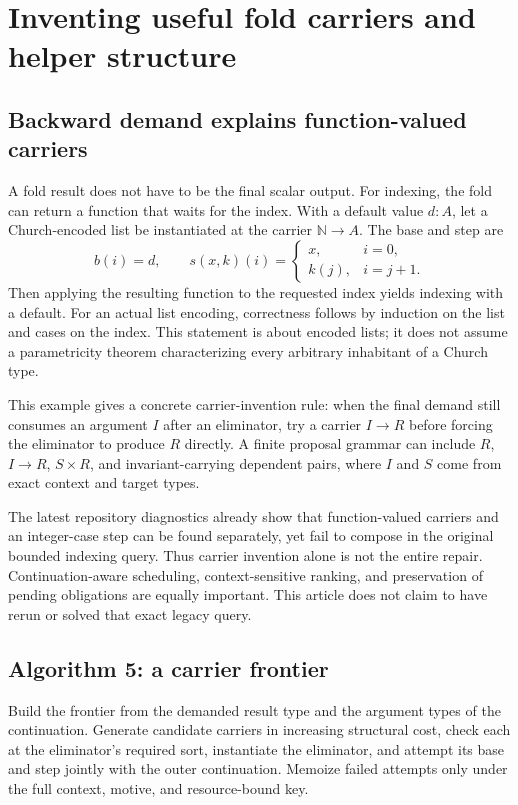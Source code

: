 \documentclass[11pt,letterpaper]{article}
\theoremstyle{definition}\newtheorem{definition}[theorem]{Definition}
\theoremstyle{remark}\newtheorem{remark}[theorem]{Remark}
\begin{document}
\section{Inventing useful fold carriers and helper structure}
\label{sec:carriers}

\subsection{Backward demand explains function-valued carriers}

A fold result does not have to be the final scalar output. For indexing, the
fold can return a function that waits for the index. With a default value $d:A$,
let a Church-encoded list be instantiated at the carrier $\mathbb N\to A$.
The base and step are
\[
 b(i)=d,\qquad
 s(x,k)(i)=
 \begin{cases}x,&i=0,\\ k(j),&i=j+1.\end{cases}
\]
Then applying the resulting function to the requested index yields indexing with
a default. For an actual list encoding, correctness follows by induction on the
list and cases on the index. This statement is about encoded lists; it does not
assume a parametricity theorem characterizing every arbitrary inhabitant of a
Church type.

This example gives a concrete carrier-invention rule: when the final demand
still consumes an argument $I$ after an eliminator, try a carrier $I\to R$ before
forcing the eliminator to produce $R$ directly. A finite proposal grammar can
include $R$, $I\to R$, $S\times R$, and invariant-carrying dependent pairs,
where $I$ and $S$ come from exact context and target types.

The latest repository diagnostics already show that function-valued carriers and
an integer-case step can be found separately, yet fail to compose in the original
bounded indexing query. Thus carrier invention alone is not the entire repair.
Continuation-aware scheduling, context-sensitive ranking, and preservation of
pending obligations are equally important. This article does not claim to have
rerun or solved that exact legacy query.\cite{indexing}

\subsection{Algorithm 5: a carrier frontier}

Build the frontier from the demanded result type and the argument types of the
continuation. Generate candidate carriers in increasing structural cost, check
each at the eliminator's required sort, instantiate the eliminator, and attempt
its base and step jointly with the outer continuation. Memoize failed attempts
only under the full context, motive, and resource-bound key.
\end{document}

